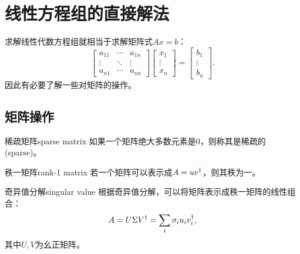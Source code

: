 \chapter{线性方程组的直接解法}

求解线性代数方程组就相当于求解矩阵式$Ax=b$：
\begin{equation}
    \begin{bmatrix}
        a_{11}&\cdots&a_{1n}\\
        \vdots&\ddots&\vdots\\
        a_{n1}&\cdots&a_{nn}
    \end{bmatrix}\begin{bmatrix}
        x_1\\\vdots\\x_n
    \end{bmatrix}=\begin{bmatrix}
        b_1\\\vdots\\b_n
    \end{bmatrix}.
\end{equation}
因此有必要了解一些对矩阵的操作。

\section{矩阵操作}

\begin{definition}
    {稀疏矩阵}{sparse matrix}
    如果一个矩阵绝大多数元素是0，则称其是稀疏的(sparse)。
\end{definition}

\begin{definition}
    {秩一矩阵}{rank-1 matrix}
    若一个矩阵可以表示成$A=uv^\dagger$，则其秩为一。
\end{definition}

\begin{theorem}
    {奇异值分解}{singular value}
    根据奇异值分解，可以将矩阵表示成秩一矩阵的线性组合：
    \begin{equation}
        A=U\Sigma V^\dagger=\sum_i\sigma_iu_iv_i^\dagger,
    \end{equation}
    其中$U,V$为幺正矩阵。
\end{theorem}

